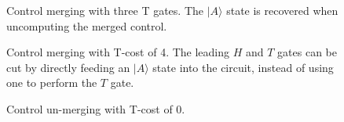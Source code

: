 \documentclass[twocolumn,longbibliography]{quantumarticle-customized}
\begin{document}
\begin{figure}
  \caption{
	Control merging with three T gates.
	The $|A\rangle$ state is recovered when uncomputing the merged control.
  }
  \label{fig:ancilla-temporary-toffoli}
\end{figure}

\begin{figure}
  \caption{
	Control merging with T-cost of 4.
	The leading $H$ and $T$ gates can be cut by directly feeding an $|A\rangle$ state into the circuit, instead of using one to perform the $T$ gate.
  }
  \label{fig:ancilla-temporary-toffoli}
\end{figure}

\begin{figure}
  \caption{
	Control un-merging with T-cost of 0.
  }
  \label{fig:ancilla-temporary-toffoli}
\end{figure}
\end{document}
